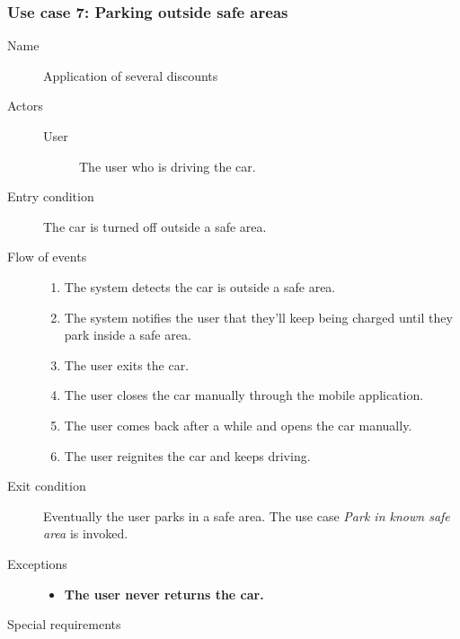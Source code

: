 	\subsubsection{Use case 7: Parking outside safe areas}
		\begin{description}
			\item[Name] Application of several discounts
			\item[Actors] \hfill
				\begin{description}
					\item[User] The user who is driving the car.
				\end{description}
			\item[Entry condition] The car is turned off outside a safe area.
			\item[Flow of events]
				\begin{enumerate}
					\item The system detects the car is outside a safe area.
					\item The system notifies the user that they'll keep being charged until they park inside a safe area.
					\item The user exits the car.
					\item The user closes the car manually through the mobile application.
					\item The user comes back after a while and opens the car manually.
					\item The user reignites the car and keeps driving.
				\end{enumerate}
			\item[Exit condition] Eventually the user parks in a safe area. The use case \textit{Park in known safe area} is invoked.
			\item[Exceptions]
				\begin{itemize}
					\item \textbf{The user never returns the car.} %
				\end{itemize}
			\item[Special requirements]
		\end{description}		


	
